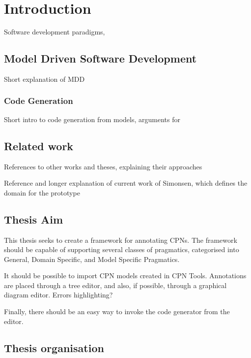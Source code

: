\chapter{Introduction}
\label{chap:introduction}

Software development paradigms, 

\section{Model Driven Software Development}

Short explanation of MDD

\subsection{Code Generation}

Short intro to code generation from models, arguments for 

\section{Related work}

References to other works and theses, explaining their approaches

Reference and longer explanation of current work of Simonsen, which defines the
domain for the prototype

\section{Thesis Aim}


This thesis seeks to create a framework for annotating CPNs. The framework
should be capable of supporting several classes of pragmatics, 
categorised into General, Domain Specific, and Model Specific Pragmatics.

It should be possible to import CPN models created in CPN Tools. Annotations are
placed through a tree editor, and also, if possible, through a graphical diagram
editor. Errors highlighting?

Finally, there should be an easy way to invoke the code generator from the
editor.

\section{Thesis organisation}

